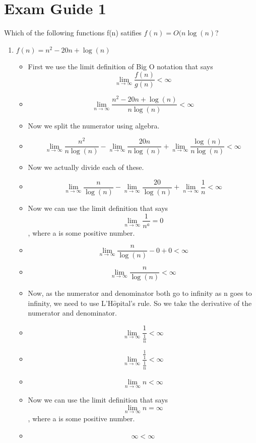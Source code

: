
\section{Exam Guide 1}
Which of the following functions f(n) satifies $f(n)=O(n\log{(n)}$?
\begin{enumerate}
\item $f(n) = n^{2}-20n+\log{(n)}$
  \begin{itemize}
  \item First we use the limit definition of Big O notation that says $$\lim_{n \to \infty} \frac{f(n)}{g(n)} < \infty$$
  \item {\large $$\lim_{n \to \infty} \frac{n^{2}-20n+\log{(n)}}{n\log{(n)}} < \infty$$}
  \item Now we split the numerator using algebra.
  \item {\large $$\lim_{n \to \infty} \frac{n^{2}}{n\log{(n)}} - \lim_{n \to \infty} \frac{20n}{n\log{(n)}} +\lim_{n \to \infty} \frac{\log{(n)}}{n\log{(n)}} < \infty$$}
  \item Now we actually divide each of these.
  \item {\large $$\lim_{n \to \infty} \frac{n}{\log{(n)}} - \lim_{n \to \infty} \frac{20}{\log{(n)}} +\lim_{n \to \infty} \frac{1}{n} < \infty$$}
  \item Now we can use the limit definition that says $$\lim_{n \to \infty} \frac{1}{n^{a}} = 0$$, where a is some positive number.
  \item {\large $$\lim_{n \to \infty} \frac{n}{\log{(n)}} -0+0 < \infty$$}
  \item {\large $$\lim_{n \to \infty} \frac{n}{\log{(n)}} < \infty$$}
  \item Now, as the numerator and denominator both go to infinity as n goes to infinity, we need to use L'H$\hat{o}$pital's rule. So we take the derivative of the numerator and denominator.
  \item {\large $$\lim_{n \to \infty} \frac{1}{\frac{1}{n}} < \infty$$}
  \item {\large $$\lim_{n \to \infty} \frac{\frac{1}{1}}{\frac{1}{n}} < \infty$$}
  \item {\large $$\lim_{n \to \infty} n < \infty$$}
  \item Now we can use the limit definition that says $$\lim_{n \to \infty} n = \infty$$, where a is some positive number.
  \item {\large $$\infty < \infty$$}

\end{itemize}
\end{enumerate}
